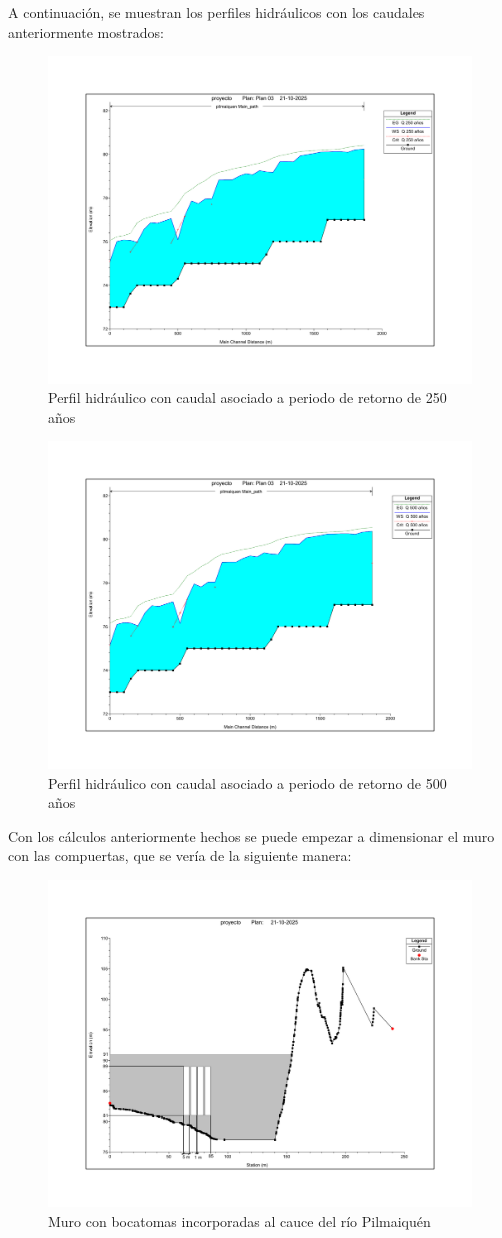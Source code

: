 \documentclass{article} %
\begin{document}
A continuación, se muestran los perfiles hidráulicos con los caudales anteriormente mostrados:

\begin{figure}[H]
    \centering
    \includegraphics[width=0.6\linewidth]{imagenes/perfil_250_sb.pdf}
    \caption{Perfil hidráulico con caudal asociado a periodo de retorno de 250 años}
\end{figure}

\begin{figure}[H]
    \centering
    \includegraphics[width=0.6\linewidth]{imagenes/perfil_500_sb.pdf}
    \caption{Perfil hidráulico con caudal asociado a periodo de retorno de 500 años}
\end{figure}

Con los cálculos anteriormente hechos se puede empezar a dimensionar el muro con las compuertas, que se vería de la siguiente manera:

\begin{figure}[H]
    \centering
    \includegraphics[width=0.8\linewidth]{imagenes/muro.pdf}
    \caption{Muro con bocatomas incorporadas al cauce del río Pilmaiquén}
\end{figure}
\end{document}
